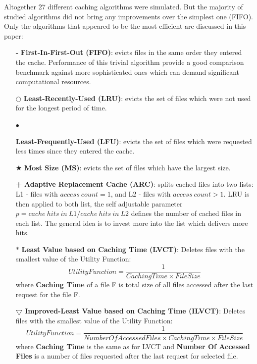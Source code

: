 \documentclass[english]{ddny}
\begin{document}
Altogether 27 different caching algorithms were simulated. But the majority of studied algorithms did not bring any improvements over the simplest one (FIFO). Only the algorithms that appeared to be the most efficient are discussed in this paper: 
\begin{itemize}
\item[\textbf{-}]\textbf{First-In-First-Out (FIFO)}: evicts files in the same order they entered the cache. Performance of this trivial algorithm  provide a good comparison benchmark against  more sophisticated ones  which can demand  significant computational resources.
\item[$\bigcirc $]\textbf{Least-Recently-Used (LRU)}: evicts the set of files which were not used for the longest period of time.
\item[\begin{Large}$\bullet $\end{Large}]\textbf{Least-Frequently-Used (LFU)}: evicts the set of files which were requested less times since they entered the cache.
\item[$\bigstar $] \textbf{Most Size (MS)}: evicts the set of files which have the largest size.
\item[\textbf{+}]\textbf{Adaptive Replacement Cache (ARC)}\cite{ARC}: splits cached files into two lists: L1 - files with $access~count=1$, and L2 - files with $access~count>1$. LRU is then applied to both list, the self adjustable parameter $p = cache~hits~in~L1 / cache~hits~in~L2$ defines the number of cached files in each list. The general idea is to invest more into the list which delivers more hits.
\item[$\ast $]{\textbf{Least Value based on Caching Time (LVCT)}}\cite{Cache_in_Grid}: Deletes files with the smallest value of the  Utility Function:
\begin{equation}
Utility Function = \frac{1}{Caching Time \times File Size}
\end{equation}   
where \textbf{Caching Time} of a file F is total size of all files accessed after the last request for the file F.
\item[$\bigtriangledown $]{\textbf{Improved-Least Value based on Caching Time (ILVCT)}}\cite{ILVCT}: Deletes files with the smallest value of the  Utility Function:
\begin{equation}
Utility Function = \frac{1}{Number Of Accessed Files \times Caching Time \times File Size}
\end{equation}   
where \textbf{Caching Time} is the same as for LVCT and \textbf{Number Of Accessed Files}  is a number of files requested after the last request for selected file. 
\end{itemize}
\end{document}

